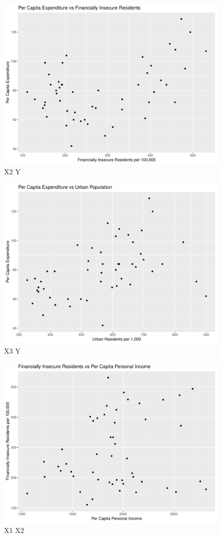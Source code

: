 \documentclass[12pt,letterpaper]{article}
\begin{document}
\begin{itemize}
 \begin{figure}[h!]\centering
	\caption{\footnotesize X2 Y}
	\label{fig:5}
	\includegraphics[width=.75\textwidth]{plot_X2_Y.pdf}
\end{figure}

\begin{figure}[h!]\centering
	\caption{\footnotesize X3 Y}
	\label{fig:6}
	\includegraphics[width=.75\textwidth]{plot_X3_Y.pdf}
\end{figure}

\begin{figure}[h!]\centering
	\caption{\footnotesize X1 X2}
	\label{fig:7}
	\includegraphics[width=.75\textwidth]{plot_X1_X2.pdf}
\end{figure}


\end{itemize}
\end{document}
